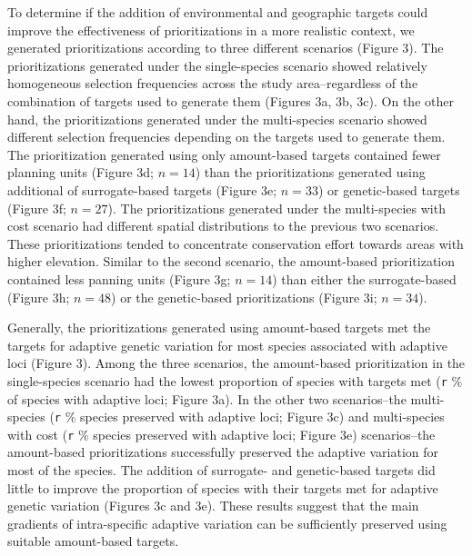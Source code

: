 \documentclass[11pt,]{article}
\begin{document}
To determine if the addition of environmental and geographic targets
could improve the effectiveness of prioritizations in a more realistic
context, we generated prioritizations according to three different
scenarios (Figure 3). The prioritizations generated under the
single-species scenario showed relatively homogeneous selection
frequencies across the study area--regardless of the combination of
targets used to generate them (Figures 3a, 3b, 3c). On the other hand,
the prioritizations generated under the multi-species scenario showed
different selection frequencies depending on the targets used to
generate them. The prioritization generated using only amount-based
targets contained fewer planning units (Figure 3d; \(n = 14\)) than the
prioritizations generated using additional of surrogate-based targets
(Figure 3e; \(n = 33\)) or genetic-based targets (Figure 3f;
\(n = 27\)). The prioritizations generated under the multi-species with
cost scenario had different spatial distributions to the previous two
scenarios. These prioritizations tended to concentrate conservation
effort towards areas with higher elevation. Similar to the second
scenario, the amount-based prioritization contained less panning units
(Figure 3g; \(n = 14\)) than either the surrogate-based (Figure 3h;
\(n = 48\)) or the genetic-based prioritizations (Figure 3i;
\(n = 34\)).

Generally, the prioritizations generated using amount-based targets met
the targets for adaptive genetic variation for most species associated
with adaptive loci (Figure 3). Among the three scenarios, the
amount-based prioritization in the single-species scenario had the
lowest proportion of species with targets met (\texttt{r} \% of species
with adaptive loci; Figure 3a). In the other two scenarios--the
multi-species (\texttt{r} \% species preserved with adaptive loci;
Figure 3c) and multi-species with cost (\texttt{r} \% species preserved
with adaptive loci; Figure 3e) scenarios--the amount-based
prioritizations successfully preserved the adaptive variation for most
of the species. The addition of surrogate- and genetic-based targets did
little to improve the proportion of species with their targets met for
adaptive genetic variation (Figures 3c and 3e). These results suggest
that the main gradients of intra-specific adaptive variation can be
sufficiently preserved using suitable amount-based targets.
\end{document}
